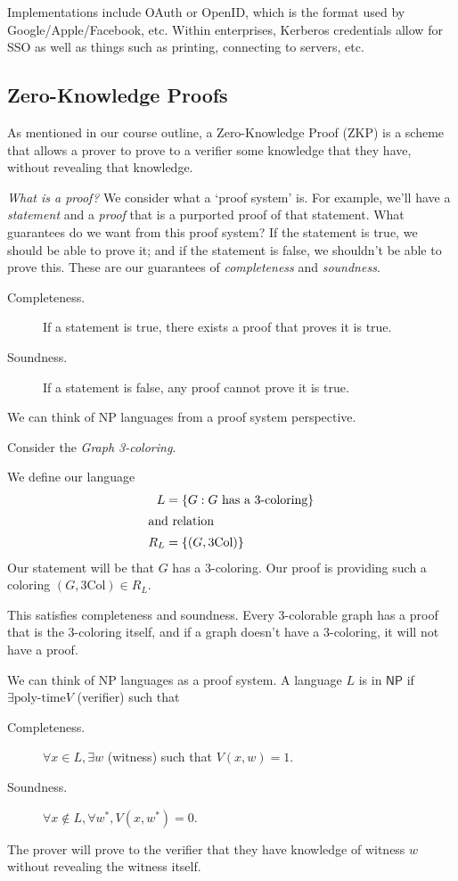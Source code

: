 Implementations include OAuth or OpenID, which is the format used by Google/Apple/Facebook, etc. Within enterprises, Kerberos credentials allow for SSO as well as things such as printing, connecting to servers, etc.


\subsection{Zero-Knowledge Proofs}
As mentioned in our course outline, a Zero-Knowledge Proof (ZKP) is a scheme that allows a prover to prove to a verifier some knowledge that they have, without revealing that knowledge.

\emph{What is a proof?} We consider what a `proof system' is. For example, we'll have a \emph{statement} and a \emph{proof} that is a purported proof of that statement. What guarantees do we want from this proof system? If the statement is true, we should be able to prove it; and if the statement is false, we shouldn't be able to prove this. These are our guarantees of \emph{completeness} and \emph{soundness}.
\begin{description}
    \item[Completeness.] If a statement is true, there exists a proof that proves it is true.
    \item[Soundness.] If a statement is false, any proof cannot prove it is true.
\end{description}

We can think of NP languages from a proof system perspective.

\begin{example}
    Consider the \emph{Graph 3-coloring}.

    We define our language
    \begin{align*}
        L   & = \{G: G\text{ has a 3-coloring}\} \\
        \intertext{and relation}
        R_L & = \{(G, \textrm{3Col})\}
    \end{align*}
    Our statement will be that $G$ has a 3-coloring. Our proof is providing such a coloring $(G, \mathrm{3Col})\in R_L$.

    This satisfies completeness and soundness. Every 3-colorable graph has a proof that is the 3-coloring itself, and if a graph doesn't have a 3-coloring, it will not have a proof.
\end{example}

We can think of NP languages as a proof system. A language $L$ is in $\mathsf{NP}$ if $\exists \text{poly-time} V$ (verifier) such that
\begin{description}
    \item[Completeness.] $\forall x\in L, \exists w$ (witness) such that $V(x, w) = 1$.
    \item[Soundness.] $\forall x\not\in L, \forall w^*, V(x, w^*) = 0$.
\end{description}
The prover will prove to the verifier that they have knowledge of witness $w$ without revealing the witness itself.

